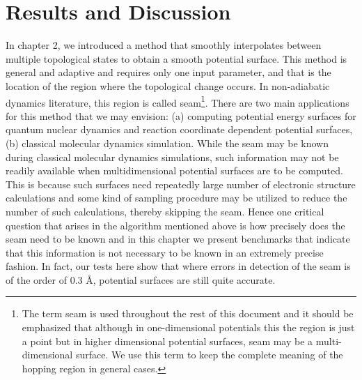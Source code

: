 \chapter{Results and Discussion}
{\label {chapter3}}
In chapter 2, we introduced a method that smoothly interpolates between multiple topological
states to obtain a smooth potential surface. This method is general and adaptive and requires
only one input parameter, and that is the location of the region where the topological change
occurs. In non-adiabatic dynamics literature, this region is called seam\footnote{The term
seam is used throughout the rest of this document and it should be emphasized that although
in one-dimensional potentials this the region is just a point but in higher dimensional
potential surfaces, seam may be a multi-dimensional surface. We use this term to keep the
complete meaning of the hopping region in general cases.}. There are two main
applications for this method that we may envision: (a) computing
potential energy surfaces for quantum nuclear dynamics and reaction coordinate dependent
potential surfaces,(b) classical molecular dynamics simulation. While the seam may be known
during classical molecular dynamics simulations, such information may not be readily
available when multidimensional potential surfaces are to be computed. This is because such
surfaces need repeatedly large number of electronic structure calculations and some kind of
sampling procedure may be utilized to reduce the number of such calculations, thereby skipping
the seam. Hence one critical question that arises in the algorithm mentioned above is how
precisely does the seam need to be known and in this chapter we present benchmarks
that indicate that this information is not necessary to be known in an extremely precise
fashion. In fact, our tests here show that where errors in detection of the seam
is of the order of 0.3 \AA, potential surfaces are still quite accurate.




